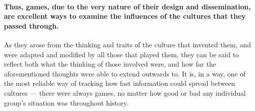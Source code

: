 \paragraph{Thus, games, due to the very nature of their design and dissemination, are excellent ways to examine the influences of the cultures that they passed through.}
As they arose from the thinking and traits of the culture that invented them, and were adapted and modified by all those that played them, they can be said
to reflect both what the thinking of those involved were, and how far the aforementioned thoughts were able to extend outwards to.
It is, in a way, one of the most reliable way of tracking how fast information could spread between cultures --- there were always games, no matter how good or bad any individual group's situation was throughout history.

